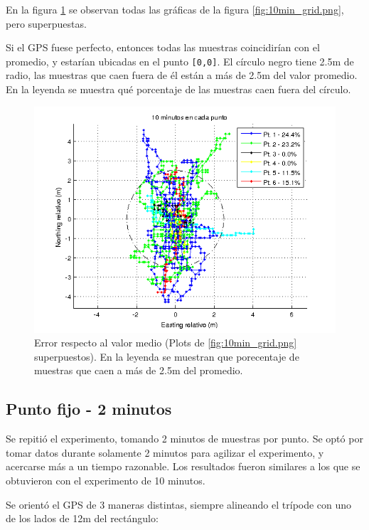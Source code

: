 \documentclass[spanish,12pt,a4paper,titlepage]{report}
\begin{document}
\newpage
En la figura \ref{fig:10m_todos.png} se observan todas las gráficas de la figura \ref{fig:10min_grid.png}, pero superpuestas.

Si el GPS fuese perfecto, entonces todas las muestras coincidirían con el promedio, y estarían ubicadas en el punto \verb+[0,0]+. El círculo negro tiene 2.5m de radio, las muestras que caen fuera de él están a más de 2.5m del valor promedio. En la leyenda se muestra qué porcentaje de las muestras caen fuera del círculo.

\begin{figure}[h!]
  \includegraphics[width=1.1\textwidth]{./img/10m_todos.png}
  \caption{Error respecto al valor medio (Plots de \ref{fig:10min_grid.png} superpuestos). En la leyenda se muestran que porecentaje de muestras que caen a más de 2.5m del promedio.}
  \label{fig:10m_todos.png}
\end{figure}

\newpage
\subsection{Punto fijo - 2 minutos}
\label{sec:gps2-punto-fijo-2-minutos}

Se repitió el experimento, tomando 2 minutos de muestras por punto. Se optó por tomar datos durante solamente 2 minutos para agilizar el experimento, y acercarse más a un tiempo razonable. Los resultados fueron similares a los que se obtuvieron con el experimento de 10 minutos.

Se orientó el GPS de 3 maneras distintas, siempre alineando el trípode con uno de los lados de 12m del rectángulo:
\end{document}
